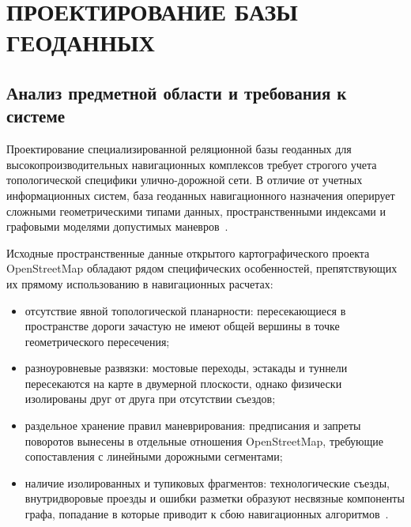 \chapter{ПРОЕКТИРОВАНИЕ БАЗЫ ГЕОДАННЫХ}
\label{chap:database_design}

\section{Анализ предметной области и требования к системе}
\label{sec:domain_analysis}

Проектирование специализированной реляционной базы геоданных для высокопроизводительных навигационных комплексов требует строгого учета топологической специфики улично-дорожной сети. В отличие от учетных информационных систем, база геоданных навигационного назначения оперирует сложными геометрическими типами данных, пространственными индексами и графовыми моделями допустимых маневров~\cite{lyashenko2019postgis, basargin2021pgrouting}.

Исходные пространственные данные открытого картографического проекта OpenStreetMap обладают рядом специфических особенностей, препятствующих их прямому использованию в навигационных расчетах:
\begin{itemize}
    \item отсутствие явной топологической планарности: пересекающиеся в пространстве дороги зачастую не имеют общей вершины в точке геометрического пересечения;
    \item разноуровневые развязки: мостовые переходы, эстакады и туннели пересекаются на карте в двумерной плоскости, однако физически изолированы друг от друга при отсутствии съездов;
    \item раздельное хранение правил маневрирования: предписания и запреты поворотов вынесены в отдельные отношения OpenStreetMap, требующие сопоставления с линейными дорожными сегментами;
    \item наличие изолированных и тупиковых фрагментов: технологические съезды, внутридворовые проезды и ошибки разметки образуют несвязные компоненты графа, попадание в которые приводит к сбою навигационных алгоритмов~\cite{tarjan2020algorithm}.
\end{itemize}

